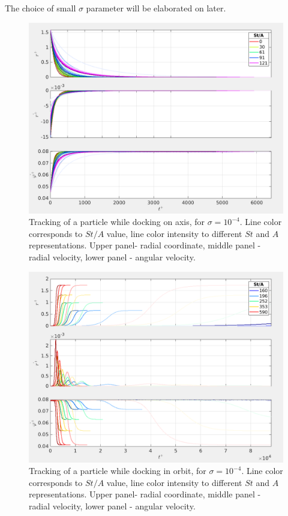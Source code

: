 \documentclass[../main.tex]{subfiles}
\begin{document}
The choice of small $\sigma$ parameter will be elaborated on later.\\

\begin{figure}
\centering
\noindent \includegraphics[width=30pc]{gfx/point_docking_vel_traj_in_time_noscal.png}
\caption{Tracking of a particle while docking on axis, for  $\sigma=10^{-4}$. Line color corresponds to $St/A$ value, line color intensity to different $St$ and $A$ representations. Upper panel- radial coordinate, middle panel - radial velocity, lower panel - angular velocity.}
\label{fig:ch3_42}
\end{figure}

\begin{figure}
\centering
\noindent \includegraphics[width=30pc]{gfx/orbit_docking_vel_traj_in_time_noscal.png}
\caption{Tracking of a particle while docking in orbit, for $\sigma=10^{-4}$. Line color corresponds to $St/A$ value, line color intensity to different $St$ and $A$ representations. Upper panel- radial coordinate, middle panel - radial velocity, lower panel - angular velocity.}
\label{fig:ch3_41}
\end{figure}
\end{document}
